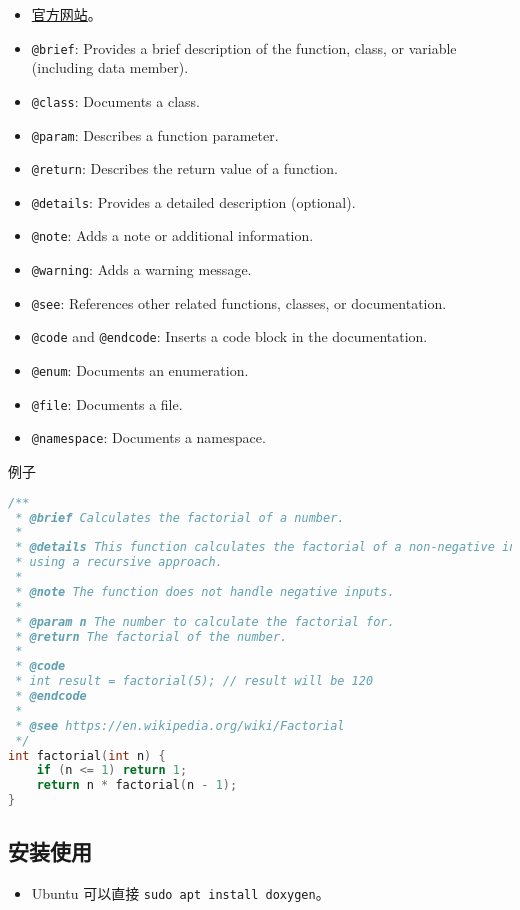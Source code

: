 
\begin{issues}
\issueDraft
\end{issues}

\begin{itemize}
\item \href{https://www.doxygen.nl/}{官方网站}。
\item \verb`@brief`: Provides a brief description of the function, class, or variable (including data member).
\item \verb`@class`: Documents a class.
\item \verb`@param`: Describes a function parameter.
\item \verb`@return`: Describes the return value of a function.
\item \verb`@details`: Provides a detailed description (optional).
\item \verb`@note`: Adds a note or additional information.
\item \verb`@warning`: Adds a warning message.
\item \verb`@see`: References other related functions, classes, or documentation.
\item \verb`@code` and \verb`@endcode`: Inserts a code block in the documentation.
\item \verb`@enum`: Documents an enumeration.
\item \verb`@file`: Documents a file.
\item \verb`@namespace`: Documents a namespace.
\end{itemize}

例子
\begin{lstlisting}[language=cpp]
/**
 * @brief Calculates the factorial of a number.
 *
 * @details This function calculates the factorial of a non-negative integer
 * using a recursive approach.
 *
 * @note The function does not handle negative inputs.
 *
 * @param n The number to calculate the factorial for.
 * @return The factorial of the number.
 *
 * @code
 * int result = factorial(5); // result will be 120
 * @endcode
 *
 * @see https://en.wikipedia.org/wiki/Factorial
 */
int factorial(int n) {
    if (n <= 1) return 1;
    return n * factorial(n - 1);
}
\end{lstlisting}

\subsection{安装使用}
\begin{itemize}
\item Ubuntu 可以直接 \verb`sudo apt install doxygen`。

\end{itemize}

